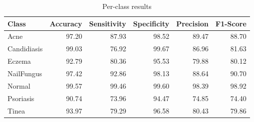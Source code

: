 \begin{table}
\caption{Per-class results}
\label{tab:results}
\begin{tabular}{lrrrrr}
\toprule
Class & Accuracy & Sensitivity & Specificity & Precision & F1-Score \\
\midrule
Acne & 97.20 & 87.93 & 98.52 & 89.47 & 88.70 \\
Candidiasis & 99.03 & 76.92 & 99.67 & 86.96 & 81.63 \\
Eczema & 92.79 & 80.36 & 95.53 & 79.88 & 80.12 \\
NailFungus & 97.42 & 92.86 & 98.13 & 88.64 & 90.70 \\
Normal & 99.57 & 99.46 & 99.60 & 98.39 & 98.92 \\
Psoriasis & 90.74 & 73.96 & 94.47 & 74.85 & 74.40 \\
Tinea & 93.97 & 79.29 & 96.58 & 80.43 & 79.86 \\
\bottomrule
\end{tabular}
\end{table}
